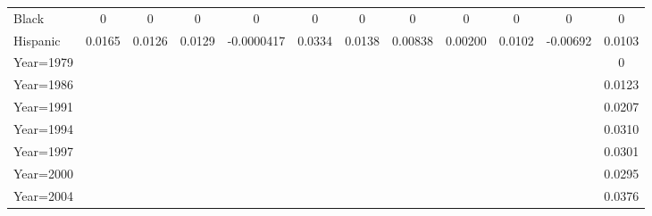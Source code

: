 \begin{table}[htbp]
\begin{tabular}{l*{11}{c}}
Black               &           0         &           0         &           0         &           0         &           0         &           0         &           0         &           0         &           0         &           0         &           0         \\
Hispanic            &      0.0165         &      0.0126         &      0.0129         &  -0.0000417         &      0.0334\sym{**} &      0.0138         &     0.00838         &     0.00200         &      0.0102         &    -0.00692         &      0.0103\sym{**} \\
Year=1979           &                     &                     &                     &                     &                     &                     &                     &                     &                     &                     &           0         \\
Year=1986           &                     &                     &                     &                     &                     &                     &                     &                     &                     &                     &      0.0123\sym{*}  \\
Year=1991           &                     &                     &                     &                     &                     &                     &                     &                     &                     &                     &      0.0207\sym{***}\\
Year=1994           &                     &                     &                     &                     &                     &                     &                     &                     &                     &                     &      0.0310\sym{***}\\
Year=1997           &                     &                     &                     &                     &                     &                     &                     &                     &                     &                     &      0.0301\sym{***}\\
Year=2000           &                     &                     &                     &                     &                     &                     &                     &                     &                     &                     &      0.0295\sym{***}\\
Year=2004           &                     &                     &                     &                     &                     &                     &                     &                     &                     &                     &      0.0376\sym{***}\\

\end{tabular}
\end{table}
